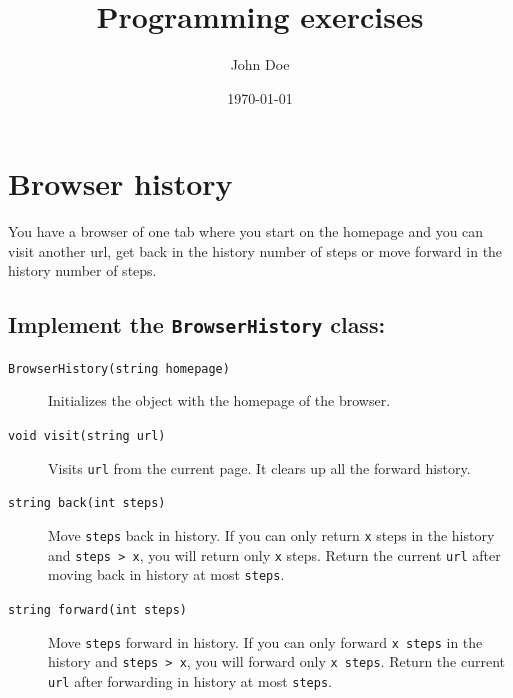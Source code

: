\documentclass[11pt]{article}
\author{John Doe}
\date{\today}
\title{Programming exercises}
\begin{document}
\maketitle
\tableofcontents


\section{Browser history}
\label{sec:org649a689}
You have a browser of one tab where you start on the homepage and you can visit another url, get back in the history
number of steps or move forward in the history number of steps.

\subsection{Implement the \texttt{BrowserHistory} class:}
\label{sec:org96a65b9}

\begin{description}
\item[{\texttt{BrowserHistory(string homepage)}}] Initializes the object with the homepage of the browser.
\item[{\texttt{void visit(string url)}}] Visits \texttt{url} from the current page. It clears up all the forward history.
\item[{\texttt{string back(int steps)}}] Move \texttt{steps} back in history. If you can only return \texttt{x} steps in the history and \texttt{steps > x}, you will return only \texttt{x} steps.
Return the current \texttt{url} after moving back in history at most \texttt{steps}.
\item[{\texttt{string forward(int steps)}}] Move \texttt{steps} forward in history. If you can only forward \texttt{x steps} in the history and \texttt{steps > x}, you will forward only \texttt{x steps}.
Return the current \texttt{url} after forwarding in history at most \texttt{steps}.
\end{description}
\end{document}
